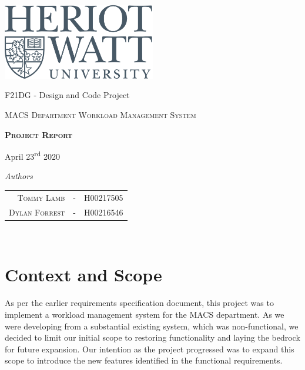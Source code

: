 \documentclass[11pt, a4paper]{article}
\begin{document}
\begin{titlepage}
	\thispagestyle{empty}
	{\centering
		\includegraphics[width=0.5\textwidth]{heriot-watt-logo.png}\par\vspace{1cm}
		\vspace{1cm}
		{\LARGE F21DG - Design and Code Project\par}
		{\LARGE \par}
		\vspace{1.5cm}
		{\scshape\Large MACS Department Workload Management System\par}
		\vspace{1.5cm}
		{\scshape\LARGE\bfseries Project Report \par}

		\vspace{3.5cm}
			\begin{center}
					April 23\textsuperscript{rd} 2020
			\end{center}
		\textit{Authors}\par
		\begin{tabular}{rcl}
			\\ \textsc{Tommy Lamb} & - & H00217505\\
			\textsc{Dylan Forrest} & - & H00216546\\
		\end{tabular} \\
	
	}
\end{titlepage}

\section{Context and Scope}

As per the earlier requirements specification document, this project was to implement a workload management system for the MACS department. As we were developing from a substantial existing system, which was non-functional, we decided to limit our initial scope to restoring functionality and laying the bedrock for future expansion. Our intention as the project progressed was to expand this scope to introduce the new features identified in the functional requirements.
\end{document}
